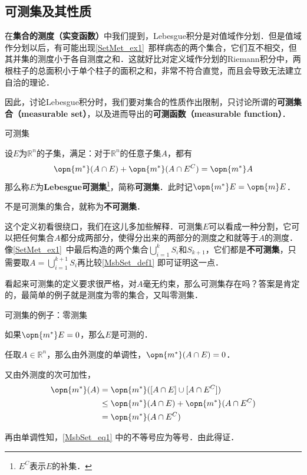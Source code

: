 

\subsection{可测集及其性质}

在\textbf{集合的测度（实变函数）}中我们提到，Lebesgue积分是对值域作分划．但是值域作分划以后，有可能出现\autoref{SetMet_ex1}~那样病态的两个集合，它们互不相交，但其并集的测度小于各自测度之和．这就好比对定义域作分划的Riemann积分中，两根柱子的总面积小于单个柱子的面积之和，非常不符合直觉，而且会导致无法建立自洽的理论．

因此，讨论Lebesgue积分时，我们要对集合的性质作出限制，只讨论所谓的\textbf{可测集合（measurable set）}，以及进而导出的\textbf{可测函数（measurable function）}．

\begin{definition}{可测集}\label{MsbSet_def1}

设$E$为$\mathbb{R}^n$的子集，满足：对于$\mathbb{R}^n$的任意子集$A$，都有
\begin{equation}
\opn{m^*}(A\cap E)+\opn{m^*}(A\cap E^C)=\opn{m^*}A
\end{equation}
那么称$E$为\textbf{Lebesgue可测集}\footnote{$E^C$表示$E$的补集．}，简称\textbf{可测集}．此时记$\opn{m^*}E=\opn{m}E$．

不是可测集的集合，就称为\textbf{不可测集}．

\end{definition}

这个定义初看很绕口，我们在这儿多加些解释．可测集$E$可以看成一种分割，它可以把任何集合$A$都分成两部分，使得分出来的两部分的测度之和就等于$A$的测度．像\autoref{SetMet_ex1}~中最后构造的两个集合$\bigcup_{i=1}^k S_i$和$S_{k+1}$，它们都是\textbf{不可测集}，只需要取$A=\bigcup^{k+1}_{i=1} S_i$再比较\autoref{MsbSet_def1} 即可证明这一点．

看起来可测集的定义要求很严格，对$A$毫无约束，那么可测集存在吗？答案是肯定的，最简单的例子就是测度为零的集合，又叫零测集．

\begin{example}{可测集的例子：零测集}

如果$\opn{m^*}E=0$，那么$E$是可测的．

任取$A\in\mathbb{R}^n$，那么由外测度的单调性，$\opn{m^*}(A\cap E)=0$．

又由外测度的次可加性，
\begin{equation}\label{MsbSet_eq1}
\begin{aligned}
\opn{m^*}(A)&=\opn{m^*}([A\cap E]\cup[A\cap E^C])\\
&\leq \opn{m^*}(A\cap E)+\opn{m^*}(A\cap E^C)\\
&=\opn{m^*}(A\cap E^C)
\end{aligned}
\end{equation}

再由单调性知，\autoref{MsbSet_eq1} 中的不等号应为等号．由此得证．

\end{example}

